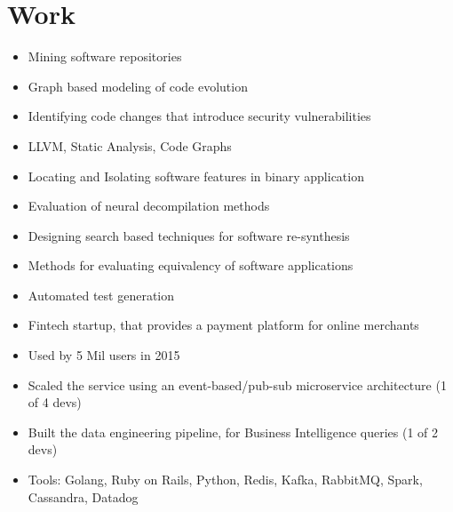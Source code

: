 \section{Work}
%
{
    \begin{itemize}
        \item Mining software repositories
        \item Graph based modeling of code evolution
        \item Identifying code changes that introduce security vulnerabilities
        \item LLVM, Static Analysis, Code Graphs
    \end{itemize}
}

{
    \begin{itemize}
        \item Locating and Isolating software features in binary application
        \item Evaluation of neural decompilation methods
        \item Designing search based techniques for software re-synthesis
        \item Methods for evaluating equivalency of software applications
        \item Automated test generation
    \end{itemize}
}


{
    \begin{itemize}
        \item Fintech startup, that provides a payment platform for online
              merchants
        \item Used by 5 Mil users in 2015
        \item Scaled the service using an event-based/pub-sub microservice
              architecture (1 of 4 devs)
        \item Built the data engineering pipeline, for Business Intelligence
              queries (1 of 2 devs)
        \item Tools: Golang, Ruby on Rails, Python, Redis, Kafka, RabbitMQ,
              Spark, Cassandra, Datadog
    \end{itemize}
}
